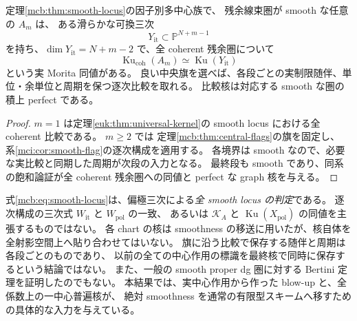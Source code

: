 \begin{corollary}
\label{mcb:cor:all-smooth-comparison}
定理\ref{mcb:thm:smooth-locus}の因子別多中心族で、
残余線束圏が smooth な任意の $A_m$ は、
ある滑らかな可換三次
\[
                       Y_{\mathrm{it}}\subset\mathbb P^{N+m-1}
\]
を持ち、$\dim Y_{\mathrm{it}}=N+m-2$ で、全 coherent 残余圏について
\[
             \operatorname{Ku}_{\mathrm{coh}}(A_m)
                   \simeq\operatorname{Ku}(Y_{\mathrm{it}})
\]
という実 Morita 同値がある。
良い中央旗を選べば、各段ごとの実制限随伴、単位・余単位と周期を保つ逐次比較を取れる。
比較核は対応する smooth な圏の積上 perfect である。
\end{corollary}

\begin{proof}
$m=1$ は定理\ref{euk:thm:universal-kernel}の smooth locus における全 coherent 比較である。
$m\ge2$ では
定理\ref{mcb:thm:central-flags}の旗を固定し、
系\ref{mci:cor:smooth-flag}の逐次構成を適用する。
各境界は smooth なので、必要な実比較と同期した周期が次段の入力となる。
最終段も smooth であり、同系の飽和論証が全 coherent 残余圏への同値と
perfect な graph 核を与える。
\end{proof}

\begin{remark}[判定と核の適用範囲]
\label{mcb:rem:scope}
式\eqref{mcb:eq:smooth-locus}は、偏極三次による\emph{全 smooth locus の判定}である。
逐次構成の三次式 $W_{\mathrm{it}}$ と $W_{\mathrm{pol}}$ の一致、
あるいは $\mathcal K_A$ と $\operatorname{Ku}(X_{\mathrm{pol}})$ の同値を主張するものではない。
各 chart の核は smoothness の移送に用いたが、核自体を全射影空間上へ貼り合わせてはいない。
旗に沿う比較で保存する随伴と周期は各段ごとのものであり、
以前の全ての中心作用の標識を最終核で同時に保存するという結論ではない。
また、一般の smooth proper dg 圏に対する Bertini 定理を証明したのでもない。
本結果では、実中心作用から作った blow-up と、全係数上の一中心普遍核が、
絶対 smoothness を通常の有限型スキームへ移すための具体的な入力を与えている。
\end{remark}
